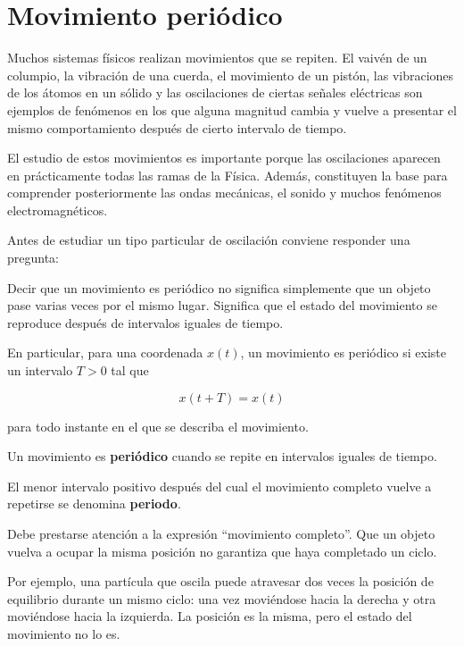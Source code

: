 ﻿\section{Movimiento periódico}

Muchos sistemas físicos realizan movimientos que se repiten. El vaivén de un columpio, la vibración de una cuerda, el movimiento de un pistón, las vibraciones de los átomos en un sólido y las oscilaciones de ciertas señales eléctricas son ejemplos de fenómenos en los que alguna magnitud cambia y vuelve a presentar el mismo comportamiento después de cierto intervalo de tiempo.

El estudio de estos movimientos es importante porque las oscilaciones aparecen en prácticamente todas las ramas de la Física. Además, constituyen la base para comprender posteriormente las ondas mecánicas, el sonido y muchos fenómenos electromagnéticos.

Antes de estudiar un tipo particular de oscilación conviene responder una pregunta:

\begin{idea}
Decir que un movimiento es periódico no significa simplemente que un objeto pase varias veces por el mismo lugar. Significa que el estado del movimiento se reproduce después de intervalos iguales de tiempo.

En particular, para una coordenada \(x(t)\), un movimiento es periódico si existe un intervalo \(T>0\) tal que

\[ x(t+T)=x(t) \]

para todo instante en el que se describa el movimiento.
\end{idea}

\begin{definicion}
Un movimiento es \textbf{periódico} cuando se repite en intervalos iguales de tiempo.

El menor intervalo positivo después del cual el movimiento completo vuelve a repetirse se denomina \textbf{periodo}.
\end{definicion}

Debe prestarse atención a la expresión ``movimiento completo''. Que un objeto vuelva a ocupar la misma posición no garantiza que haya completado un ciclo.

Por ejemplo, una partícula que oscila puede atravesar dos veces la posición de equilibrio durante un mismo ciclo: una vez moviéndose hacia la derecha y otra moviéndose hacia la izquierda. La posición es la misma, pero el estado del movimiento no lo es.

